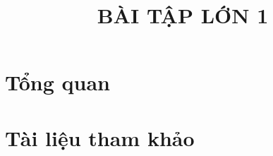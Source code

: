 \documentclass[twoside, final]{hcmut_report}
\title{\LARGE  BÀI TẬP LỚN 1}
\begin{document}
\coverpage
\pagestyle{empty}
\tableofcontents
\pagestyle{fancy}
\pagebreak
\section{Tổng quan}
\section*{Tài liệu tham khảo}




\end{document}
